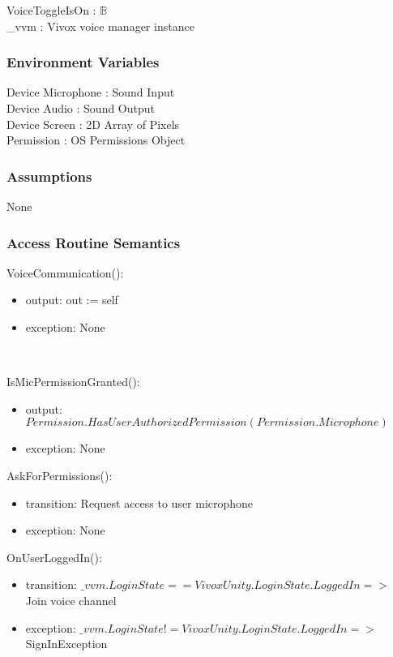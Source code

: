 \documentclass[12pt, titlepage]{article}
\begin{document}
VoiceToggleIsOn : $\mathds{B}$\\
\_vvm : Vivox voice manager instance

\subsubsection{Environment Variables}

Device Microphone : Sound Input\\
Device Audio : Sound Output\\
Device Screen : 2D Array of Pixels\\
Permission : OS Permissions Object

\subsubsection{Assumptions}

None\\

\subsubsection{Access Routine Semantics}

\noindent VoiceCommunication():
\begin{itemize}
\item output: out := self
\item exception: None
\end{itemize}\

\noindent IsMicPermissionGranted():
\begin{itemize}
\item output: $Permission.HasUserAuthorizedPermission(Permission.Microphone)$
\item exception: None
\end{itemize}

\noindent AskForPermissions():
\begin{itemize}
\item transition: Request access to user microphone
\item exception: None
\end{itemize}

\noindent OnUserLoggedIn():
\begin{itemize}
\item transition: $\_vvm.LoginState == VivoxUnity.LoginState.LoggedIn =>$ Join voice channel
\item exception: $\_vvm.LoginState != VivoxUnity.LoginState.LoggedIn =>$ SignInException
\end{itemize}
\end{document}
